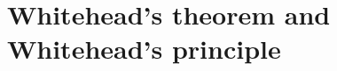 \documentclass[hott-all.tex]{subfiles}
\begin{document}
\section{Whitehead's theorem and Whitehead's principle}
% 
% 
% 
% 
% 
\end{document}

